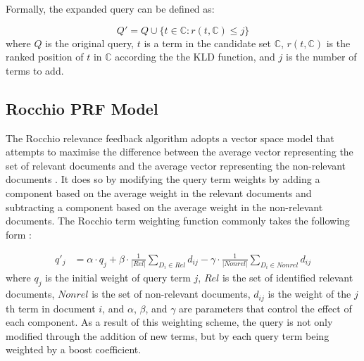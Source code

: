 \documentclass[a4paper]{report}
\begin{document}
Formally, the expanded query can be defined as:

$$Q' = Q \cup \{ t \in \mathbb{C} : r(t,\mathbb{C}) \leq j \}$$
where $Q$ is the original query, $t$ is a term in the candidate set $\mathbb{C}$, $r(t,\mathbb{C})$ is the ranked position of $t$ in $\mathbb{C}$ according the the KLD function, and $j$ is the number of terms to add.

\subsection{Rocchio PRF Model}
The Rocchio relevance feedback algorithm adopts a vector space model that attempts to maximise the difference between the average vector representing the set of relevant documents and the average vector representing the non-relevant documents \cite{10020859664}. It does so by modifying the query term weights by adding a component based on the average weight in the relevant documents and subtracting a component based on the average weight in the non-relevant documents. The Rocchio term weighting function commonly takes the following form \cite{croft2010search}:

\begin{equation}
\label{rocchioalg}
\begin{split}
  q'_j &= \alpha \cdot q_j + \beta \cdot \frac{1}{|Rel|} \sum_{D_i\in Rel} d_{ij} - \gamma \cdot \frac{1}{|Nonrel|} \sum_{D_i \in Nonrel} d_{ij} 
\end{split}
\end{equation}
where $q_j$ is the initial weight of query term $j$, $Rel$ is the set of identified relevant documents, $Nonrel$ is the set of non-relevant documents, $d_{ij}$ is the weight of the $j$th term in document $i$, and $\alpha$, $\beta$, and $\gamma$ are parameters that control the effect of each component. As a result of this weighting scheme, the query is not only modified through the addition of new terms, but by each query term being weighted by a boost coefficient. 
\end{document}
